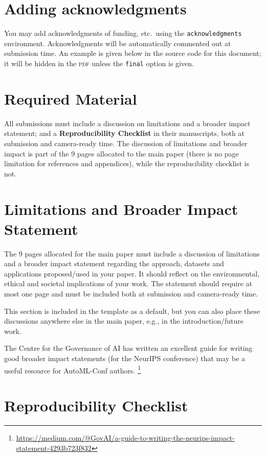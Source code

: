 \documentclass[11pt]{article}
\begin{document}
\section{Adding acknowledgments}

You may add acknowledgments of funding, etc.\ using the \texttt{acknowledgments}
environment. Acknowledgments will be automatically commented out at submission
time. An example is given below in the source code for this document; it will be
hidden in the \textsc{pdf} unless the \texttt{final} option is given.

\section{Required Material}

All submissions must include a discussion on limitations and a broader impact 
statement; and a \textbf{Reproducibility Checklist} in their manuscripts, both
at submission and camera-ready time.
The discussion of limitations and broader impact is part of the 9 pages allocated 
to the main paper (there is no page limitation for references and appendices), while
the reproducibility checklist is not.

\section{Limitations and Broader Impact Statement}

The 9 pages allocated for the main paper must include a discussion of limitations 
and a broader impact statement regarding the approach, datasets and applications 
proposed/used in your paper. It should reflect on the environmental, ethical and 
societal implications of your work. The statement should require at most one page
and must be included both at submission and camera-ready time.

This section is included in the template as a default, but you can also place these
discussions anywhere else in the main paper, e.g., in the introduction/future work.

The Centre for the Governance of AI has written an excellent guide for writing
good broader impact statements (for the NeurIPS conference) that may be a useful
resource for AutoML-Conf authors.%
%
\footnote{\url{https://medium.com/@GovAI/a-guide-to-writing-the-neurips-impact-statement-4293b723f832}}

\section{Reproducibility Checklist}
\end{document}
